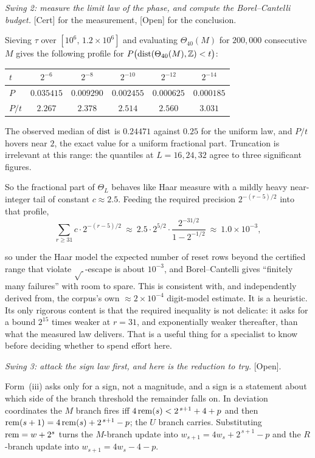 \documentclass[11pt]{article}
\theoremstyle{plain}
\theoremstyle{definition}
\theoremstyle{remark}
\let\origmathrm\mathrm
\renewcommand{\mathrm}[1]{\ifmmode\origmathrm{#1}\else\textrm{#1}\fi}%
\newcommand{\ev}[1]{{\small\textsf{[#1]}}\xspace}
\newcommand{\Z}{\mathbb{Z}}
\begin{document}
\emph{Swing 2: measure the limit law of the phase, and compute the Borel--Cantelli budget.}
\ev{Cert} for the measurement, \ev{Open} for the conclusion.

Sieving $\tau$ over $[10^6,\,1.2\times10^6]$ and evaluating $\Theta_{40}(M)$ for $200{,}000$
consecutive $M$ gives the following profile for $P\bigl(\mathrm{dist}(\Theta_{40}(M),\Z)<t\bigr)$:
\begin{center}
\begin{tabular}{lccccc}
\hline
$t$ & $2^{-6}$ & $2^{-8}$ & $2^{-10}$ & $2^{-12}$ & $2^{-14}$\\
\hline
$P$ & $0.035415$ & $0.009290$ & $0.002455$ & $0.000625$ & $0.000185$\\
$P/t$ & $2.267$ & $2.378$ & $2.514$ & $2.560$ & $3.031$\\
\hline
\end{tabular}
\end{center}

The observed median of $\mathrm{dist}$ is $0.24471$ against $0.25$ for the uniform law, and
$P/t$ hovers near $2$, the exact value for a uniform fractional part. Truncation is irrelevant at
this range: the quantiles at $L=16,24,32$ agree to three significant figures.

So the fractional
part of $\Theta_L$ behaves like Haar measure with a mildly heavy near-integer tail of constant
$c\approx 2.5$. Feeding the required precision $2^{-(r-5)/2}$ into that profile,
\[
\sum_{r\ge 31} c\cdot 2^{-(r-5)/2}\ \approx\ 2.5\cdot 2^{5/2}\cdot\frac{2^{-31/2}}{1-2^{-1/2}}
\ \approx\ 1.0\times 10^{-3},
\]

so under the Haar model the expected number of reset rows beyond the certified range that violate
$\sqrt{\ }$-escape is about $10^{-3}$, and Borel--Cantelli gives ``finitely many failures'' with
room to spare. This is consistent with, and independently derived from, the corpus's own
$\approx 2\times10^{-4}$ digit-model estimate. It is a heuristic. Its only rigorous content is
that the required inequality is not delicate: it asks for a bound $2^{15}$ times weaker at
$r=31$, and exponentially weaker thereafter, than what the measured law delivers. That is a
useful thing for a specialist to know before deciding whether to spend effort here.

\emph{Swing 3: attack the sign law first, and here is the reduction to try.} \ev{Open}.

Form~(iii) asks only for a sign, not a magnitude, and a sign is a statement about which side of
the branch threshold the remainder falls on. In deviation coordinates the $M$ branch fires iff
$4\,\mathrm{rem}(s)<2^{\,s+1}+4+p$ and then $\mathrm{rem}(s+1)=4\,\mathrm{rem}(s)+2^{\,s+1}-p$;
the $U$ branch carries. Substituting $\mathrm{rem}=w+2^{s}$ turns the $M$-branch update into
$w_{s+1}=4w_s+2^{\,s+1}-p$ and the $R$-branch update into $w_{s+1}=4w_s-4-p$.
\end{document}
